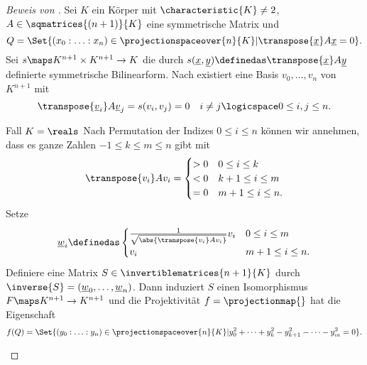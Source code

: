
\begin{proof}[Beweis von ]
  Sei \( K \) ein Körper mit \( \characteristic{K}\neq 2 \), \( A\in \sqmatrices{(n+1)}{K} \) eine symmetrische Matrix und
  \begin{equation*}
    Q=\Set{(x_0:\dotsc:x_n)\in \projectionspaceover{n}{K}|\transpose{\underline{x}}A\underline{x}=0}.
  \end{equation*}
  Sei \( s\maps K^{n+1}\times K^{n+1}\to K \) die durch \( s(\underline{x},\underline{y})\definedas \transpose{\underline{x}}A\underline{y} \) definierte symmetrische Bilinearform. Nach  existiert eine Basis \( v_0,\dotsc,v_n \) von \( K^{n+1} \) mit 
  \begin{equation*}
    \transpose{\underline{v}_i}A\underline{v}_j=s(v_i,v_j)=0\quad i\neq j\logicspace  0\leq i,j\leq n.
  \end{equation*}
  \begin{proofdescription}
    \item[Fall \( K=\reals \)] Nach Permutation der Indizes \( 0\leq i\leq n \) können wir annehmen, dass es ganze Zahlen \( -1\leq k\leq m\leq n \) gibt mit
    \begin{equation*}
      \transpose{v_i}A v_i=\begin{cases}
        >0 & 0\leq i\leq k\\
        <0 & k+1\leq i\leq m\\
        =0 & m+1\leq i\leq n.
      \end{cases}
    \end{equation*}
    Setze
    \begin{equation*}
      \underline{w}_i\definedas \begin{cases}
        \frac{1}{\sqrt{\abs{\transpose{v_i}Av_i}}}v_i&0\leq i\leq m\\
        v_i & m+1\leq i\leq n.
      \end{cases}
    \end{equation*}
    Definiere eine Matrix \( S\in \invertiblematrices{n+1}{K} \) durch \( \inverse{S}=(\underline{w}_0,\dotsc,\underline{w}_n) \). Dann induziert \( S \) einen Isomorphismus \( F\maps K^{n+1}\to K^{n+1} \) und die Projektivität \( f=\projectionmap{} \) hat die Eigenschaft
    \begin{equation*}
      f(Q)=\Set{(y_0:\dotsc:y_n)\in \projectionspaceover{n}{K}|y_0^2+\dotsb+y_k^2-y_{k+1}^2-\dotsb-y_m^2=0}.

\end{equation*}
\end{proofdescription}
\end{proof}

